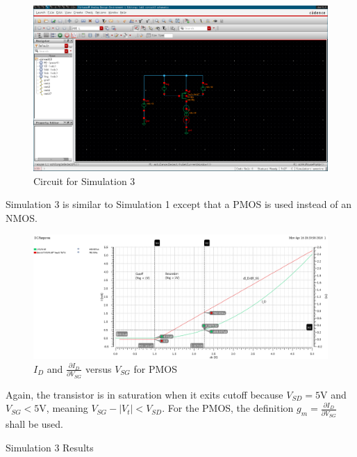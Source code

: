 \FloatBarrier

\begin{figure}[h!]
	\centering
	\includegraphics[scale=0.30]{./images/circuit3.PNG}
	\caption{Circuit for Simulation 3}
	\label{fig:circuit3}
\end{figure}

\FloatBarrier

Simulation 3 is similar to Simulation 1 except that a PMOS is used instead of an NMOS.

\FloatBarrier

\begin{figure}[h!]
	\centering
	\includegraphics[scale=0.45]{./images/500ua_point_pmos.PNG}
	\caption{$I_{D}$ and $\frac{\partial I_{D}}{\partial V_{SG}}$ versus $V_{SG}$ for PMOS}
	\label{fig:id_vs_vgs_pmos}
\end{figure}

\FloatBarrier

Again, the transistor is in saturation when it exits cutoff because $V_{SD} = 5$\si{\volt} and $V_{SG} < 5$\si{\volt}, meaning $V_{SG} - |V_{t}| < V_{SD}$.
For the PMOS, the definition $g_{m} = \frac{\partial I_{D}}{\partial V_{SG}}$ shall be used.

\FloatBarrier

\begin{table}[h!]
	\centering
	\caption{Simulation 3 Results}
	\label{tab:sim3_results}
\end{table}

\FloatBarrier
